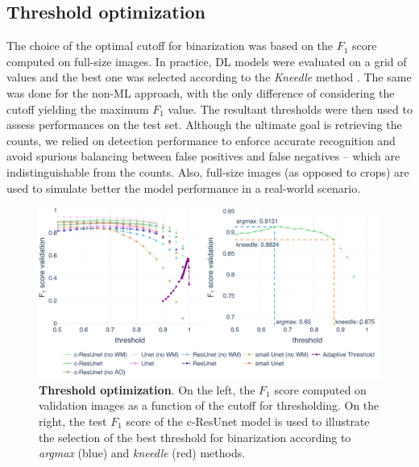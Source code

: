 \subsection{Threshold optimization}

The choice of the optimal cutoff for binarization was based on the $F_1$ score computed on full-size images. In practice, DL models were evaluated on a grid of values and the best one was selected according to the \textit{Kneedle} method \cite{kneedle}. 
The same was done for the non-ML approach, with the only difference of considering the cutoff yielding the maximum $F_1$ value. 
The resultant thresholds were then used to assess performances on the test set.
Although the ultimate goal is retrieving the counts, we relied on detection performance to enforce accurate recognition and avoid spurious balancing between false positives and false negatives -- which are indistinguishable from the counts.
Also, full-size images (as opposed to crops) are used to simulate better the model performance in a real-world scenario.
\begin{figure}
\centerline{
\includegraphics[width=\textwidth]{figures/130_methods/F1_optimization.pdf}
}
\caption{\textbf{Threshold optimization}. On the left, the $F_{1}$ score computed on validation images as a function of the cutoff for thresholding.
On the right, the test $F_1$ score of the c-ResUnet model is used to illustrate the selection of the best threshold for binarization according to \textit{argmax} (blue) and \textit{kneedle} (red) methods.
} 
\label{fig:thresh_opt}
\end{figure}

